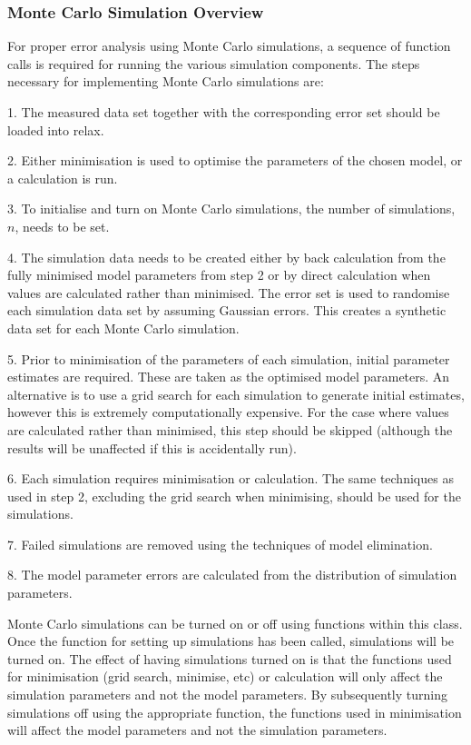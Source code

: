   
 \subsubsection{Monte Carlo Simulation Overview} 

 For proper error analysis using Monte Carlo simulations, a sequence of function calls is required for running the various simulation components.  The steps necessary for implementing Monte Carlo simulations are: 
  

 1.  The measured data set together with the corresponding error set should be loaded into relax. 
  

 2.  Either minimisation is used to optimise the parameters of the chosen model, or a calculation is run. 
  

 3.  To initialise and turn on Monte Carlo simulations, the number of simulations, $n$, needs to be set. 
  

 4.  The simulation data needs to be created either by back calculation from the fully minimised model parameters from step 2 or by direct calculation when values are calculated rather than minimised.  The error set is used to randomise each simulation data set by assuming Gaussian errors.  This creates a synthetic data set for each Monte Carlo simulation. 
  

 5.  Prior to minimisation of the parameters of each simulation, initial parameter estimates are required.  These are taken as the optimised model parameters.  An alternative is to use a grid search for each simulation to generate initial estimates, however this is extremely computationally expensive.  For the case where values are calculated rather than minimised, this step should be skipped (although the results will be unaffected if this is accidentally run). 
  

 6.  Each simulation requires minimisation or calculation.  The same techniques as used in step 2, excluding the grid search when minimising, should be used for the simulations. 
  

 7.  Failed simulations are removed using the techniques of model elimination. 
  

 8.  The model parameter errors are calculated from the distribution of simulation parameters. 
  

 Monte Carlo simulations can be turned on or off using functions within this class.  Once the function for setting up simulations has been called, simulations will be turned on.  The effect of having simulations turned on is that the functions used for minimisation (grid search, minimise, etc) or calculation will only affect the simulation parameters and not the model parameters.  By subsequently turning simulations off using the appropriate function, the functions used in minimisation will affect the model parameters and not the simulation parameters. 
  

